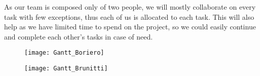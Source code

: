 
As our team is composed only of two people, we will mostly collaborate on every task with few exceptions, thus each of us is allocated to each task. This will also help as we have limited time to spend on the project, so we could easily continue and complete each other's tasks in case of need.\\
\newpage
\begin{figure}[H]
\hspace*{-4cm}\texttt{[image: Gantt\_Boriero]}
\end{figure}

\begin{figure}[H]
\hspace*{-4cm}\texttt{[image: Gantt\_Brunitti]}
\end{figure}
\newpage